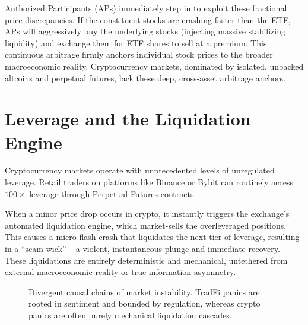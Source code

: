 Authorized Participants (APs) immediately step in to exploit these fractional price discrepancies. If the constituent stocks are crashing faster than the ETF, APs will aggressively buy the underlying stocks (injecting massive stabilizing liquidity) and exchange them for ETF shares to sell at a premium. This continuous arbitrage firmly anchors individual stock prices to the broader macroeconomic reality. Cryptocurrency markets, dominated by isolated, unbacked altcoins and perpetual futures, lack these deep, cross-asset arbitrage anchors.

\section{Leverage and the Liquidation Engine}

Cryptocurrency markets operate with unprecedented levels of unregulated leverage. Retail traders on platforms like Binance or Bybit can routinely access $100\times$ leverage through Perpetual Futures contracts. 

When a minor price drop occurs in crypto, it instantly triggers the exchange's automated liquidation engine, which market-sells the overleveraged positions. This causes a micro-flash crash that liquidates the next tier of leverage, resulting in a ``scam wick'' -- a violent, instantaneous plunge and immediate recovery. These liquidations are entirely deterministic and mechanical, untethered from external macroeconomic reality or true information asymmetry.

\begin{figure}[htbp]
\centering
{}
\caption{Divergent causal chains of market instability. TradFi panics are rooted in sentiment and bounded by regulation, whereas crypto panics are often purely mechanical liquidation cascades.}
\label{fig:tradfi_vs_crypto}
\end{figure}

